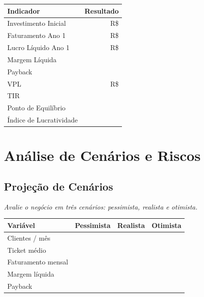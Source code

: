 \documentclass[
	12pt,
	openright,
	oneside,
	a4paper,
	chapter=TITLE,
	section=TITLE,
	english,
	brazil
	]{abntex2}
\newcommand{\tcampo}[1]{%
	{#1}%
}
\newcommand{\instrucao}[1]{%
	\vspace{0.3cm}%
	\noindent%
	{%
		\setlength{\fboxsep}{6pt}%
		\colorbox{azul-claro}{%
			\begin{minipage}{\dimexpr\textwidth-2\fboxsep\relax}%
				\setlength{\parindent}{1.25cm}%
				{\color{cinza-instrucao}\small\itshape #1}%
			\end{minipage}%
		}%
	}%
	\vspace{0.3cm}%
}
\begin{document}
\centering
\begin{tabularx}{\textwidth}{X r}
\toprule
\rowcolor{azul-claro}
\textbf{Indicador} & \textbf{Resultado} \\
\midrule
Investimento Inicial      & R\$ \tcampo{} \\
Faturamento Ano 1         & R\$ \tcampo{} \\
Lucro Líquido Ano 1       & R\$ \tcampo{} \\
Margem Líquida            & \tcampo{} \\
Payback                   & \tcampo{} \\
VPL                       & R\$ \tcampo{} \\
TIR                       & \tcampo{} \\
Ponto de Equilíbrio       & \tcampo{} \\
Índice de Lucratividade   & \tcampo{} \\
\bottomrule
\end{tabularx}
\label{tab:indicadores-viabilidade}

\clearpage

\chapter{Análise de Cenários e Riscos}

\section{Projeção de Cenários}

\instrucao{Avalie o negócio em três cenários: pessimista, realista e otimista.}

\centering
\begin{tabularx}{\textwidth}{X c c c}
\toprule
\rowcolor{azul-claro}
\textbf{Variável} & \textbf{Pessimista} & \textbf{Realista} & \textbf{Otimista} \\
\midrule
Clientes / mês      & \tcampo{} & \tcampo{} & \tcampo{} \\
Ticket médio        & \tcampo{} & \tcampo{} & \tcampo{} \\
Faturamento mensal  & \tcampo{} & \tcampo{} & \tcampo{} \\
Margem líquida      & \tcampo{} & \tcampo{} & \tcampo{} \\
Payback             & \tcampo{} & \tcampo{} & \tcampo{} \\
\bottomrule
\end{tabularx}
\end{document}
